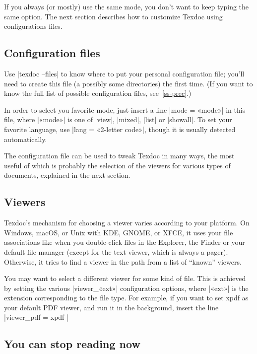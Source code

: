 \documentclass[a4paper,oneside]{scrartcl}
\begin{document}
If you always (or mostly) use the same mode, you don't want to keep typing the
same option. The next section describes how to customize Texdoc using
configurations files.

\subsection{Configuration files}\label{ss-quick-file}

Use |texdoc --files| to know where to put your personal configuration file;
you'll need to create this file (a possibly some directories) the first time.
(If you want to know the full list of possible configuration files,
see~\ref{ss-prec}.)

In order to select you favorite mode, just insert a line |mode = «mode»| in
this file, where |«mode»| is one of |view|, |mixed|, |list| or |showall|. To
set your favorite language, use |lang = «2-letter code»|, though it is usually
detected automatically.

The configuration file can be used to tweak Texdoc in many ways, the most
useful of which is probably the selection of the viewers for various types of
documents, explained in the next section.

\subsection{Viewers}\label{ss-viewer}

Texdoc's mechanism for choosing a viewer varies according to your platform.
On Windows, macOS, or Unix with KDE, GNOME, or XFCE, it uses your file
associations like when you double-click files in the Explorer, the Finder or
your default file manager (except for the text viewer, which is always a
pager). Otherwise, it tries to find a viewer in the path from a list of
``known'' viewers.

You may want to select a different viewer for some kind of file. This is
achieved by setting the various |viewer_«ext»| configuration options, where
|«ext»| is the extension corresponding to the file type. For example, if you
want to set xpdf as your default PDF viewer, and run it in the background,
insert the line |viewer_pdf = xpdf %
|%

\subsection{You can stop reading now}
\end{document}

